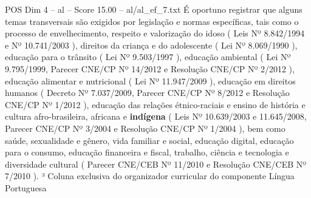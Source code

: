 \begin{textsample}{POS Dim 4 – al – Score 15.00 – al/al\_ef\_7.txt}
É oportuno registrar que alguns temas transversais são exigidos por legislação e normas específicas, tais como o processo de envelhecimento, respeito e valorização do idoso ( Leis Nº 8.842/1994 e Nº 10.741/2003 ), direitos da criança e do adolescente ( Lei Nº 8.069/1990 ), educação para o trânsito ( Lei Nº 9.503/1997 ), educação ambiental ( Lei Nº 9.795/1999, Parecer CNE/CP Nº 14/2012 e Resolução CNE/CP Nº 2/2012 ), educação alimentar e nutricional ( Lei Nº 11.947/2009 ), educação em direitos humanos ( Decreto Nº 7.037/2009, Parecer CNE/CP Nº 8/2012 e Resolução CNE/CP Nº 1/2012 ), educação das relações étnico-raciais e ensino de história e cultura afro-brasileira, africana e \textbf{indígena} ( Leis Nº 10.639/2003 e 11.645/2008, Parecer CNE/CP Nº 3/2004 e Resolução CNE/CP Nº 1/2004 ), bem como saúde, sexualidade e gênero, vida familiar e social, educação digital, educação para o consumo, educação financeira e fiscal, trabalho, ciência e tecnologia e diversidade cultural ( Parecer CNE/CEB Nº 11/2010 e Resolução CNE/CEB Nº 7/2010 ). ³ Coluna exclusiva do organizador curricular do componente Língua Portuguesa

\end{textsample}
